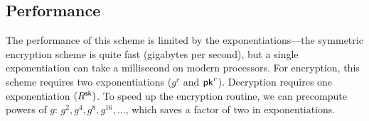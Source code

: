 \subsection{Performance}
The performance of this scheme is limited by the exponentiations---the symmetric encryption scheme is quite fast (gigabytes per second), but a single exponentiation can take a millisecond on modern processors. For encryption, this scheme requires two exponentiations ($g^r$ and $\mathsf{pk}^r$). Decryption requires one exponentiation $(R^{\mathsf{sk}})$.
To speed up the encryption routine, we can precompute powers of $g$: $g^2, g^4, g^8, g^{16}, \dots$, which saves a factor of two in exponentiations.

